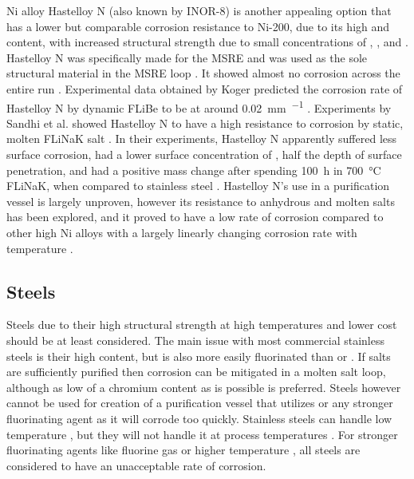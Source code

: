 Ni alloy Hastelloy N (also known by INOR-8) is another appealing option
that has a lower but comparable corrosion resistance to Ni-200, due to
its high  and  content, with increased structural strength due
to small concentrations of , , and  \cite{rev50,rev51}.
Hastelloy N was specifically made for the MSRE and was used as the sole
structural material in the MSRE loop \cite{rev51}. It showed almost no
corrosion across the entire run \cite{rev51}. Experimental data obtained by
Koger predicted the corrosion rate of Hastelloy N by dynamic FLiBe to be at
around \SI{0.02}{\milli\meter\per\year} \cite{rev36}. Experiments by Sandhi
et al. showed Hastelloy N to have a high resistance to corrosion by static,
molten FLiNaK salt \cite{rev37}. In their experiments, Hastelloy N
apparently suffered less surface corrosion, had a lower surface concentration
of , half the depth of surface penetration, and had a positive mass
change after spending \SI{100}{\hour} in \SI{700}{\celsius} FLiNaK, when
compared to stainless steel \cite{rev37}. Hastelloy N’s use in a purification
vessel is largely unproven, however its resistance to anhydrous  and
molten salts has been explored, and it proved to have a low rate of corrosion
compared to other high Ni alloys with a largely linearly changing corrosion
rate with temperature \cite{rev37,rev50,rev51}. \par

\subsection{Steels}
\label{sec: steels}

Steels due to their high structural strength at high temperatures and lower
cost should be at least considered. The main issue with most commercial
stainless steels is their high  content, but  is also more
easily fluorinated than  or . If salts are sufficiently
purified then corrosion can be mitigated in a molten salt loop, although
as low of a chromium content as is possible is preferred. Steels however
cannot be used for creation of a purification vessel that utilizes 
or any stronger fluorinating agent as it will corrode too quickly.
Stainless steels can handle low temperature , but they will not
handle it at process temperatures \cite{rev50}. For stronger fluorinating
agents like fluorine gas or higher temperature , all steels are
considered to have an unacceptable rate of corrosion. \cite{rev50} \par

